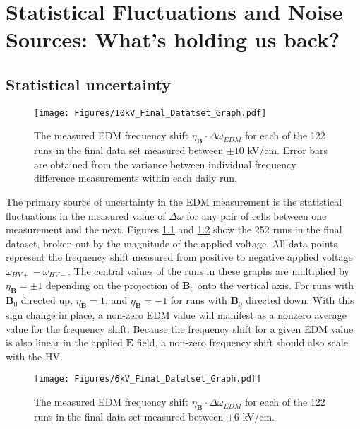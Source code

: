 \documentclass [10pt, twoside] {uwthesis}[2012/04/02]
\begin{document}
\chapter{Statistical Fluctuations and Noise Sources: What's holding us back?}
\section{Statistical uncertainty}
\begin{figure}[t] \label{10kV_final_result_graph}
\begin{center}
\texttt{[image: Figures/10kV\_Final\_Datatset\_Graph.pdf]}
\end{center}
\caption[Final EDM data set, $\pm$10 kV runs]
{\narrower The measured EDM frequency shift $\eta_{\mathbf{B}}\cdot\Delta \omega_{EDM}$ for each of the 122 runs in the final data set measured between $\pm 10$ kV/cm. Error bars are obtained from the variance between individual frequency difference measurements within each daily run.}
\end{figure} 
The primary source of uncertainty in the EDM measurement is the statistical fluctuations in the measured value of $\Delta\omega$ for any pair of cells between one measurement and the next. Figures \ref{10kV_final_result_graph} and \ref{6kV_final_result_graph} show the 252 runs in the final dataset, broken out by the magnitude of the applied voltage. All data points represent the frequency shift measured from positive to negative applied voltage $\omega_{HV+} - \omega_{HV-}$. The central values of the runs in these graphs are multiplied by $\eta_{\mathbf{B}} = \pm 1$ depending on the projection of $\mathbf{B}_0$ onto the vertical axis. For runs with $\mathbf{B}_0$ directed up, $\eta_{\mathbf{B}} = 1$, and $\eta_{\mathbf{B}} = -1$ for runs with $\mathbf{B}_0$ directed down. With this sign change in place, a non-zero EDM value will manifest as a nonzero average value for the frequency shift. Because the frequency shift for a given EDM value is also linear in the applied $\mathbf{E}$ field, a non-zero frequency shift should also scale with the HV. 

\begin{figure}[t] \label{6kV_final_result_graph}
\begin{center}
\texttt{[image: Figures/6kV\_Final\_Datatset\_Graph.pdf]}
\end{center}
\caption[Final EDM data set, $\pm$6 kV runs]
{\narrower The measured EDM frequency shift $\eta_{\mathbf{B}}\cdot\Delta \omega_{EDM}$ for each of the 122 runs in the final data set measured between $\pm 6$ kV/cm.}
\end{figure}
\end{document}
